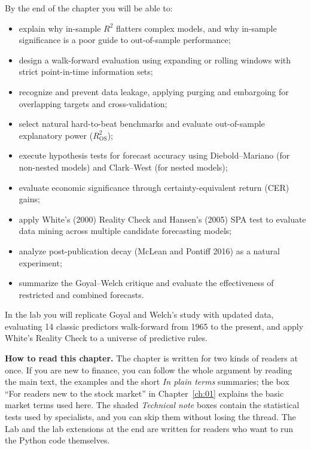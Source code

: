 By the end of the chapter you will be able to:
\begin{itemize}
  \item explain why in-sample $R^2$ flatters complex models, and why in-sample significance is a poor guide to out-of-sample performance;
  \item design a walk-forward evaluation using expanding or rolling windows with strict point-in-time information sets;
  \item recognize and prevent data leakage, applying purging and embargoing for overlapping targets and cross-validation;
  \item select natural hard-to-beat benchmarks and evaluate out-of-sample explanatory power ($R^2_{\text{OS}}$);
  \item execute hypothesis tests for forecast accuracy using Diebold--Mariano (for non-nested models) and Clark--West (for nested models);
  \item evaluate economic significance through certainty-equivalent return (CER) gains;
  \item apply White's (2000) Reality Check and Hansen's (2005) SPA test to evaluate data mining across multiple candidate forecasting models;
  \item analyze post-publication decay (McLean and Pontiff 2016) as a natural experiment;
  \item summarize the Goyal--Welch critique and evaluate the effectiveness of restricted and combined forecasts.
\end{itemize}

In the lab you will replicate Goyal and Welch's study with updated data, evaluating 14 classic predictors walk-forward from 1965 to the present, and apply White's Reality Check to a universe of predictive rules.

\begin{callout}
\textbf{How to read this chapter.} The chapter is written for two kinds of readers at once. If you are new to finance, you can follow the whole argument by reading the main text, the examples and the short \emph{In plain terms} summaries; the box ``For readers new to the stock market'' in Chapter~\ref{ch:01} explains the basic market terms used here. The shaded \emph{Technical note} boxes contain the statistical tests used by specialists, and you can skip them without losing the thread. The Lab and the lab extensions at the end are written for readers who want to run the Python code themselves.
\end{callout}

